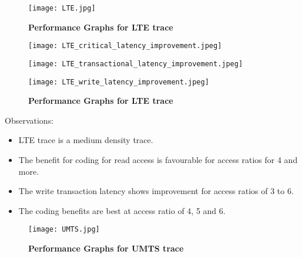 \begin{landscape}
\cleardoublepage
\begin{figure}[htb]
\begin{minipage}[!t]{\linewidth}
        \texttt{[image: LTE.jpg]}
\end{minipage}
\caption{
{\bf Performance Graphs for LTE trace} }
\label{fig:LTE}
\end{figure}
\cleardoublepage
\begin{figure}[htb]
\begin{minipage}[!t]{0.33\linewidth}
        \texttt{[image: LTE\_critical\_latency\_improvement.jpeg]}
\end{minipage}
\begin{minipage}[!t]{0.33\linewidth}
        \texttt{[image: LTE\_transactional\_latency\_improvement.jpeg]}
\end{minipage}
\begin{minipage}[!t]{0.33\linewidth}
        \texttt{[image: LTE\_write\_latency\_improvement.jpeg]}
\end{minipage}
\caption{
{\bf Performance Graphs for LTE trace} }
\label{fig:LTE_improvement}
\end{figure}
Observations:
\begin{itemize}
	\item LTE trace is a medium density trace.
	\item The benefit for coding for read access is favourable for access ratios for 4 and more. 
	\item The write transaction latency shows improvement for access ratios of 3 to 6.
	\item The coding benefits are best at access ratio of 4, 5 and 6.
\end{itemize}
\cleardoublepage
\begin{figure}[htb]
\begin{minipage}[!t]{\linewidth}
        \texttt{[image: UMTS.jpg]}
\end{minipage}
\caption{
{\bf Performance Graphs for UMTS trace} }
\label{fig:LTE}
\end{figure}
\cleardoublepage

\end{landscape}
